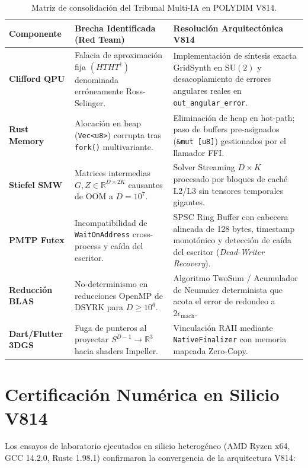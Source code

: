 \begin{table}[h]
\centering
\begin{tabular}{|l|p{5cm}|p{6.5cm}|}
\hline
\textbf{Componente} & \textbf{Brecha Identificada (Red Team)} & \textbf{Resolución Arquitectónica V814} \\ \hline
\textbf{Clifford QPU} & Falacia de aproximación fija $(HTHT^\dagger)$ denominada erróneamente Ross-Selinger. & Implementación de síntesis exacta GridSynth en $\mathrm{SU}(2)$ y desacoplamiento de errores angulares reales en \texttt{out\_angular\_error}. \\ \hline
\textbf{Rust Memory} & Alocación en heap (\texttt{Vec<u8>}) corrupta tras \texttt{fork()} multivariante. & Eliminación de heap en hot-path; paso de buffers pre-asignados (\texttt{\&mut [u8]}) gestionados por el llamador FFI. \\ \hline
\textbf{Stiefel SMW} & Matrices intermedias $G, Z \in \mathbb{R}^{D \times 2K}$ causantes de OOM a $D=10^7$. & Solver Streaming $D \times K$ procesado por bloques de caché L2/L3 sin tensores temporales gigantes. \\ \hline
\textbf{PMTP Futex} & Incompatibilidad de \texttt{WaitOnAddress} cross-process y caída del escritor. & SPSC Ring Buffer con cabecera alineada de 128 bytes, timestamp monotónico y detección de caída del escritor (\textit{Dead-Writer Recovery}). \\ \hline
\textbf{Reducción BLAS} & No-determinismo en reducciones OpenMP de DSYRK para $D \ge 10^6$. & Algoritmo TwoSum / Acumulador de Neumaier determinista que acota el error de redondeo a $2\epsilon_{\text{mach}}$. \\ \hline
\textbf{Dart/Flutter 3DGS} & Fuga de punteros al proyectar $S^{D-1} \to \mathbb{R}^3$ hacia shaders Impeller. & Vinculación RAII mediante \texttt{NativeFinalizer} con memoria mapeada Zero-Copy. \\ \hline
\end{tabular}
\caption{Matriz de consolidación del Tribunal Multi-IA en POLYDIM V814.}
\label{tab:v814_tribunal_matriz}
\end{table}

\section{Certificación Numérica en Silicio V814}

Los ensayos de laboratorio ejecutados en silicio heterogéneo (AMD Ryzen x64, GCC 14.2.0, Rustc 1.98.1) confirmaron la convergencia de la arquitectura V814:

